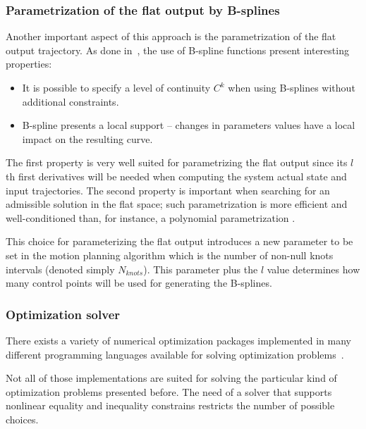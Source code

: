 \documentclass[eprint]{actapoly}
\begin{document}
\subsubsection{Parametrization of the flat output by B-splines}

Another important aspect of this approach is the parametrization of 
the flat output trajectory. As done in~\cite{Milam2003}, the use
of B-spline functions present interesting properties:


\begin{itemize}


 \item It is possible to specify a level of continuity $C^k$ when using
 B-splines without additional constraints.
 
 \item B-spline presents a local support -- changes in parameters values have a 
 local impact on the resulting curve.
 
 
\end{itemize}

The first property is very well suited for parametrizing the flat output since
its $l$th first derivatives will be needed when computing the system actual state
and input trajectories. The second property is important when searching for an
admissible solution in the flat space; such parametrization is more efficient
and well-conditioned than, for instance, a polynomial parametrization \cite{Milam2003}.


This choice for parameterizing the flat output introduces a new parameter to be set in
the motion planning algorithm which is the number of non-null knots intervals 
(denoted simply $N_{knots}$). This parameter plus the $l$ value determines how many 
control points will be used for generating the B-splines.

\subsubsection{Optimization solver}

There exists a variety of numerical optimization packages implemented in many different programming languages available for solving optimization problems~\cite{pyopt-paper}.

Not all of those implementations are suited for solving
the particular kind of optimization problems presented before.
The need of a solver that supports nonlinear equality and inequality constrains
restricts the number of possible choices.
\end{document}
